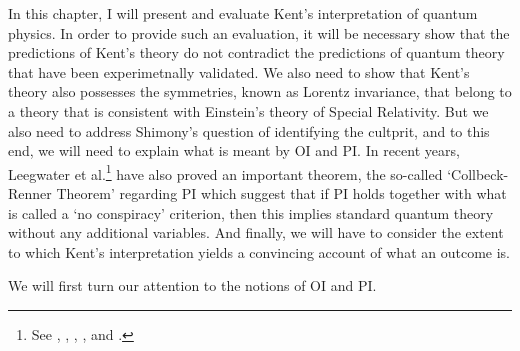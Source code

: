 In this chapter, I will present and evaluate Kent's interpretation of quantum physics. In order to provide such an evaluation, it will be necessary show that the predictions of Kent's theory do not contradict the  predictions of quantum theory that have been experimetnally validated. We also need to show that Kent's theory also possesses the symmetries, known as Lorentz invariance, that belong to a theory that is consistent with Einstein's theory of Special Relativity. But we also need to address Shimony's question of identifying the cultprit, and to this end, we will need to explain what is meant by OI and PI. In recent years,  Leegwater et al.\footnote{See \cite{LeegwaterGijs2016Aitf}, \cite{ColbeckRoger2011Neoq}, \cite{ColbeckRoger2012Tcoq}, \cite{LandsmanK2015OtCt}, and \cite{Landsman}.} have also proved an important theorem, the so-called {`Collbeck-Renner Theorem'} regarding PI which suggest that if PI holds together with what is called a {`no conspiracy'} criterion, then this implies standard quantum theory without any additional variables. And finally, we will have to consider the extent to which Kent's interpretation yields a convincing account of what an outcome is.

We will first turn our attention to the notions of OI and PI.

